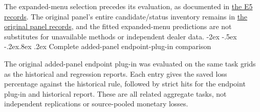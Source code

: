 \documentclass[10pt,a4paper]{article}
\makeatletter
\renewcommand\section{\@startsection{section}{1}{\z@}%
  {-2ex \@plus -.5ex \@minus -.2ex}{.8ex \@plus .2ex}%
  {\normalfont\large\bfseries}}
\makeatother
\begin{document}
The expanded-menu selection precedes its evaluation, as documented in \href{https://github.com/ByronLi0207/financial-mathematics-paper-20261020/blob/revision-v7-final/results/supervisor-20261023/e5/README.md}{the E5 records}. The original panel's entire candidate/status inventory remains in
\href{https://github.com/ByronLi0207/financial-mathematics-paper-20261020/blob/revision-v7-final/results/revision-20261023/round2/panel/summary.csv}{the original panel records},
and the fitted expanded-menu predictions are not substitutes for unavailable
methods or independent dealer data.\section{Complete added-panel endpoint-plug-in comparison}\label{sup:panel-levy}

The original added-panel endpoint plug-in was evaluated on the
same task grids as the historical and regression reports. Each entry gives
the saved loss percentage against the historical rule, followed by strict
hits for the endpoint plug-in and historical report. These are all related
aggregate tasks, not independent replications or source-pooled monetary losses.
\begingroup
\footnotesize
\setlength{\tabcolsep}{3pt}
\renewcommand{\arraystretch}{1.12}
\end{document}
